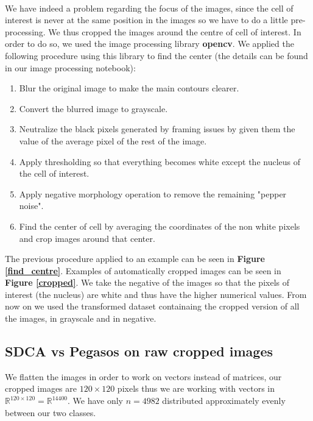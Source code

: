 \documentclass[10pt,a4paper]{article}
\begin{document}
\paragraph{}
We have indeed a problem regarding the focus of the images, since the cell of interest is never at the same position in the images so we have to do a little pre-processing. We thus cropped the images around the centre of cell of interest. In order to do so, we used the image processing library \textbf{opencv}. We applied the following procedure using this library to find the center (the details can be found in our image processing notebook): 
\begin{enumerate}
	\item Blur the original image to make the main contours clearer.
	\item Convert the blurred image to grayscale.
	\item Neutralize the black pixels generated by framing issues by given them the value of the average pixel of the rest of the image.
	\item Apply thresholding so that everything becomes white except the nucleus of the cell of interest.
	\item Apply negative morphology operation to remove the remaining "pepper noise".
	\item Find the center of cell by averaging the coordinates of the non white pixels and crop images around that center.
\end{enumerate}

The previous procedure applied to an example can be seen in \textbf{Figure  \ref{find_centre}}. Examples of automatically cropped images can be seen in \textbf{Figure \ref{cropped}}. We take the negative of the images so that the pixels of interest (the nucleus) are white and thus have the higher numerical values. From now on we used the transformed dataset containaing the cropped version of all the images, in grayscale and in negative.



\subsection {SDCA vs Pegasos on raw cropped images}

We flatten the images in order to work on vectors instead of matrices, our cropped images are $120 \times 120$ pixels thus we are working with vectors in $\mathbb{R}^{120\times120} = \mathbb{R}^{14400}$. We have only $n=4982$ distributed approximately evenly between our two classes.
\end{document}
